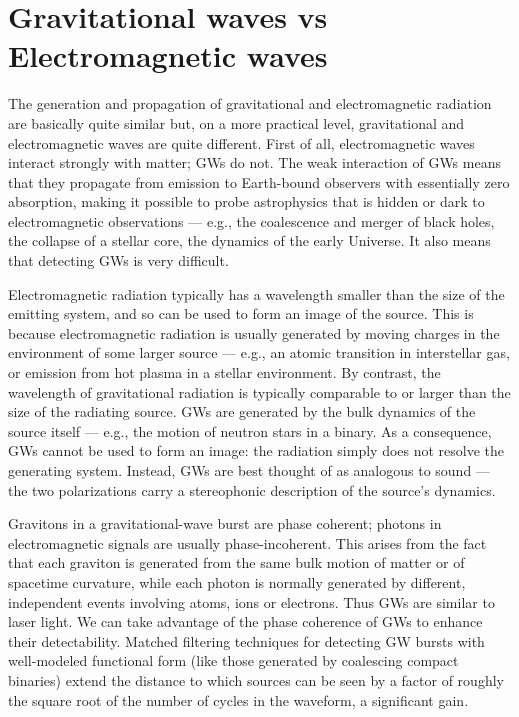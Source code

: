 \documentclass[binding=0.6cm, LaM]{sapthesis}
\begin{document}
\section{Gravitational waves vs Electromagnetic waves}
The generation and propagation of gravitational and electromagnetic radiation are basically quite similar but, on a more practical level, gravitational and electromagnetic waves are quite different.
First of all, electromagnetic waves interact strongly with matter; GWs do not.
The weak interaction of GWs means that they propagate from emission to Earth-bound observers with essentially zero absorption, making it possible to probe astrophysics that is hidden or dark to
electromagnetic observations — e.g., the coalescence and merger of black holes, the collapse of a stellar core, the dynamics of the early Universe. It also means that detecting GWs is very difficult.

Electromagnetic radiation typically has a wavelength smaller than the size of the emitting system, and so can be used to form an image of the source.
 This is because electromagnetic radiation is usually generated by moving charges in the environment of some larger source — e.g., an atomic transition in interstellar gas, or emission from hot plasma
 in a stellar environment. By contrast, the wavelength of gravitational radiation is typically comparable to or larger than the size of the radiating source.
GWs are generated by the bulk dynamics of the source itself — e.g., the motion of neutron stars in a binary. As a consequence, GWs cannot be used to form an image: the radiation simply does not
resolve the generating system. Instead, GWs are best thought of as analogous to sound — the two polarizations carry a stereophonic description of the source’s dynamics.

Gravitons in a gravitational-wave burst are phase coherent; photons in electromagnetic signals are usually phase-incoherent. This arises from the fact that each graviton is generated from the same
bulk motion of matter or of spacetime curvature, while each photon is normally generated by different, independent events involving atoms, ions or electrons.
Thus GWs are similar to laser light. We can take advantage of the phase coherence of GWs to enhance their detectability. Matched filtering techniques for detecting GW bursts with well-modeled
functional form (like those generated by coalescing compact binaries) extend the distance to which sources can be seen by a factor of roughly the square root of the number of cycles in the waveform,
a significant gain.
\end{document}
